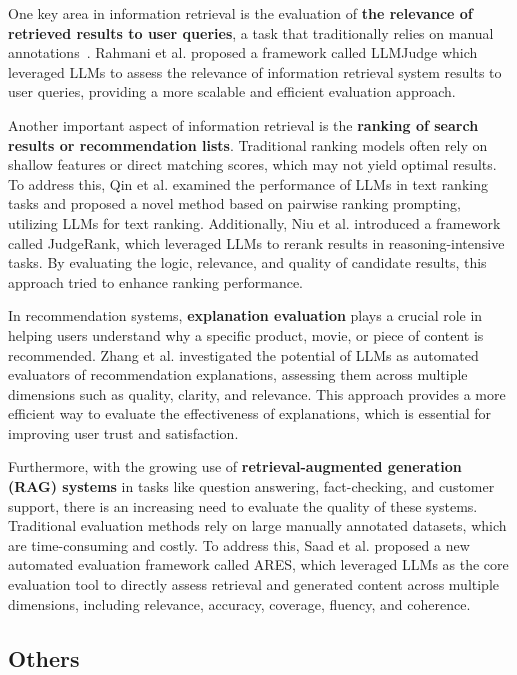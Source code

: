 One key area in information retrieval is the evaluation of \textbf{the relevance of retrieved results to user queries}, a task that traditionally relies on manual annotations~\cite{soboroff2024don,rahmani2024llmjudge}. Rahmani et al. \cite{rahmani2024llmjudge} proposed a framework called LLMJudge which leveraged LLMs to assess the relevance of information retrieval system results to user queries, providing a more scalable and efficient evaluation approach.

Another important aspect of information retrieval is the \textbf{ranking of search results or recommendation lists}. Traditional ranking models often rely on shallow features or direct matching scores, which may not yield optimal results. To address this,  Qin et al. \cite{qin2023large} examined the performance of LLMs in text ranking tasks and proposed a novel method based on pairwise ranking prompting, utilizing LLMs for text ranking. Additionally, Niu et al. \cite{niu2024judgerank} introduced a framework called JudgeRank, which leveraged LLMs to rerank results in reasoning-intensive tasks. By evaluating the logic, relevance, and quality of candidate results, this approach tried to enhance ranking performance.

In recommendation systems, \textbf{explanation evaluation} plays a crucial role in helping users understand why a specific product, movie, or piece of content is recommended. Zhang et al. \cite{zhang2024large} investigated the potential of LLMs as automated evaluators of recommendation explanations, assessing them across multiple dimensions such as quality, clarity, and relevance. This approach provides a more efficient way to evaluate the effectiveness of explanations, which is essential for improving user trust and satisfaction.

Furthermore, with the growing use of \textbf{retrieval-augmented generation (RAG) systems} in tasks like question answering, fact-checking, and customer support, there is an increasing need to evaluate the quality of these systems. Traditional evaluation methods rely on large manually annotated datasets, which are time-consuming and costly. To address this, Saad et al. \cite{saad2023ares} proposed a new automated evaluation framework called ARES, which leveraged LLMs as the core evaluation tool to directly assess retrieval and generated content across multiple dimensions, including relevance, accuracy, coverage, fluency, and coherence.

\subsection{Others}
\label{sec: Others}

